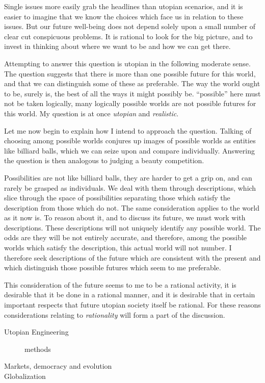 Single issues more easily grab the headlines than utopian scenarios, and it is easier to imagine that we know the choices which face us in relation to these issues.
But our future well-being does not depend solely upon a small number of clear cut conspicuous problems.
It is rational to look for the big picture, and to invest in thinking about where we want to be and how we can get there.

Attempting to answer this question is utopian in the following moderate sense.
The question suggests that there is more than one possible future for this world, and that we can distinguish some of these as preferable.
The way the world ought to be, surely is, the best of all the ways it might possibly be.
``possible'' here must not be taken logically, many logically possible worlds are not possible futures for this world.
My question is at once {\it utopian} and {\it realistic}.

Let me now begin to explain how I intend to approach the question.
Talking of choosing among possible worlds conjures up images of possible worlds as entities like billiard balls, which we can seize upon and compare individually.
Answering the question is then analogous to judging a beauty competition.

Possibilities are not like billiard balls, they are harder to get a grip on, and can rarely be grasped as individuals.
We deal with them through descriptions, which slice through the space of possibilities separating those which satisfy the description from those which do not.
The same consideration applies to the world as it now is.
To reason about it, and to discuss its future, we must work with descriptions.
These descriptions will not uniquely identify any possible world.
The odds are they will be not entirely accurate, and therefore, among the possible worlds which satisfy the description, this actual world will not number.
I therefore seek descriptions of the future which are consistent with the present and which distinguish those possible futures which seem to me preferable.

This consideration of the future seems to me to be a rational activity, it is desirable that it be done in a rational manner, and it is desirable that in certain important respects that future utopian society itself be rational.
For these reasons considerations relating to {\it rationality} will form a part of the discussion.

\begin{description}
\item[Utopian Engineering] methods
\item[Markets, democracy and evolution]
\item[Globalization]
\end{description}

